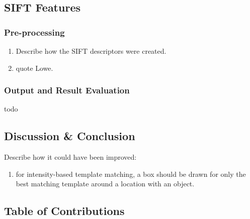 \documentclass[a4paper,11pt,twocolumn]{article}
\begin{document}

\section{SIFT Features}

\subsection{Pre-processing}

\begin{enumerate}
    \item Describe how the SIFT descriptors were created.
    \item quote Lowe.
\end{enumerate}

\subsection{Output and Result Evaluation}

todo


\section{Discussion \& Conclusion}

Describe how it could have been improved:
\begin{enumerate}
    \item for intensity-based template matching, a box should be drawn for only the best matching template around a location with an object.
\end{enumerate}


\raggedright



\onecolumn
\clearpage
\begin{appendices}

\chapter{Table of Contributions}



\end{appendices}
\end{document}
